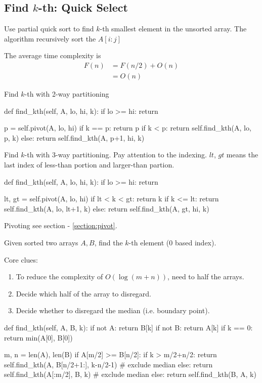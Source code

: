 \subsection{Find $k$-th: Quick Select}
Use partial quick sort to find $k$-th smallest element in the unsorted array. The algorithm recursively sort the $A[i:j]$

The average time complexity is
\begin{align*}
F(n) &= F(n/2) + O(n) \\
&= O(n)
\end{align*}

Find $k$-th with 2-way partitioning
\begin{python}
def find_kth(self, A, lo, hi, k):
    if lo >= hi: return
    
    p = self.pivot(A, lo, hi)
    if k == p: return p
    if k < p:  return self.find_kth(A, lo, p, k)
    else:      return self.find_kth(A, p+1, hi, k)
\end{python}
Find $k$-th with 3-way partitioning. Pay attention to the indexing. $lt$, $gt$ means the last index of less-than portion and larger-than partion. 
\begin{python}
def find_kth(self, A, lo, hi, k):
    if lo >= hi: return

    lt, gt = self.pivot(A, lo, hi)
    if lt < k < gt: return k
    if k <= lt: return self.find_kth(A, lo, lt+1, k)
    else:       return self.find_kth(A, gt, hi, k)
\end{python}

Pivoting see section - \ref{section:pivot}.

 Given sorted two arrays $A, B$, find the $k$-th element (0 based index).

Core clues:
\begin{enumerate}
\item To reduce the complexity of $O(\log (m+n))$, need to half the arrays.
\item Decide which half of the array to disregard. 
\item Decide whether to disregard the median (i.e. boundary point).
\end{enumerate}
\begin{python}
def find_kth(self, A, B, k):
  if not A:  return B[k]
  if not B:  return A[k]
  if k == 0: return min(A[0], B[0])

  m, n = len(A), len(B)
  if A[m/2] >= B[n/2]:
    if k > m/2+n/2:
      return self.find_kth(A, B[n/2+1:], k-n/2-1)  # exclude median
    else:
      return self.find_kth(A[:m/2], B, k)  # exclude median
  else:
    return self.find_kth(B, A, k)
\end{python}
